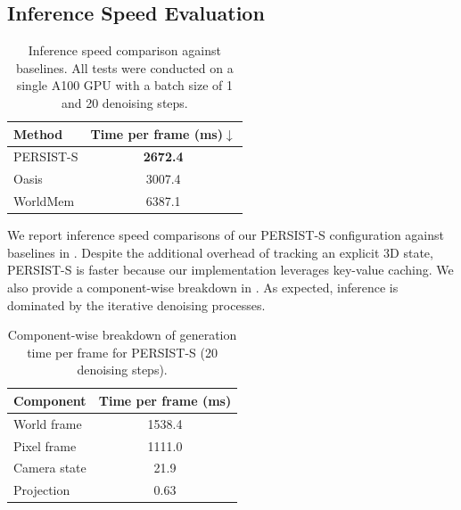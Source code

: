 \begin{subappendices}


\section{Inference Speed Evaluation}\label{c4:app:speed}

\begin{table}[h]
  \centering
  \caption{Inference speed comparison against baselines. All tests were conducted on a single A100 GPU with a batch size of 1 and 20 denoising steps.}
  \setlength{\tabcolsep}{4pt}
  \begin{tabular}{lc}
  \toprule
  Method & Time per frame (ms)$\downarrow$ \\
  \midrule
  PERSIST-S & \textbf{2672.4} \\
  Oasis & 3007.4 \\
  WorldMem & 6387.1 \\
  \bottomrule
  \end{tabular}
  \label{c4:tab:speed-baselines}
  \vspace{0.5cm}
\end{table}

We report inference speed comparisons of our PERSIST-S configuration against baselines in . Despite the additional overhead of tracking an explicit 3D state, PERSIST-S is faster because our implementation leverages key-value caching. We also provide a component-wise breakdown in . As expected, inference is dominated by the iterative denoising processes.

\begin{table}[h]
  \centering
  \caption{Component-wise breakdown of generation time per frame for PERSIST-S (20 denoising steps).}
  \setlength{\tabcolsep}{4pt}
  \begin{tabular}{lc}
  \toprule
  Component & Time per frame (ms) \\
  \midrule
  World frame & 1538.4 \\
  Pixel frame & 1111.0 \\
  Camera state & 21.9 \\
  Projection & 0.63 \\
  \bottomrule
  \end{tabular}
  \label{c4:tab:speed-components}
  \vspace{1cm}
\end{table}


\end{subappendices}
